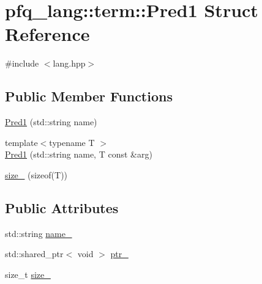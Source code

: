 \hypertarget{structpfq__lang_1_1term_1_1Pred1}{\section{pfq\-\_\-lang\-:\-:term\-:\-:Pred1 Struct Reference}
\label{structpfq__lang_1_1term_1_1Pred1}
}


{\ttfamily \#include $<$lang.\-hpp$>$}

\subsection*{Public Member Functions}
\begin{DoxyCompactItemize}
\item 
\hyperlink{structpfq__lang_1_1term_1_1Pred1_a02ac41bef185feeb0e03a557b8f9524b}{Pred1} (std\-::string name)
\item 
{\footnotesize template$<$typename T $>$ }\\\hyperlink{structpfq__lang_1_1term_1_1Pred1_a03e16b9dfb73db543c9c38e0a2e3c553}{Pred1} (std\-::string name, T const \&arg)
\item 
\hyperlink{structpfq__lang_1_1term_1_1Pred1_ac17268e2b9a94f4b8148c231bc5a4ee4}{size\-\_\-} (sizeof(T))
\end{DoxyCompactItemize}
\subsection*{Public Attributes}
\begin{DoxyCompactItemize}
\item 
std\-::string \hyperlink{structpfq__lang_1_1term_1_1Pred1_a2e8fa633d20f23a5bda4f1d1d2d7c40a}{name\-\_\-}
\item 
std\-::shared\-\_\-ptr$<$ void $>$ \hyperlink{structpfq__lang_1_1term_1_1Pred1_aab8272102e260db367460682dc3f51c5}{ptr\-\_\-}
\item 
size\-\_\-t \hyperlink{structpfq__lang_1_1term_1_1Pred1_a00e31cd95cdaeed41806c33a487072f8}{size\-\_\-}
\end{DoxyCompactItemize}


